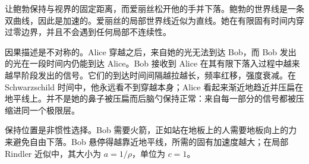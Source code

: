 让鲍勃保持与视界的固定距离，而爱丽丝松开他的手并下落。鲍勃的世界线是一条双曲线，因此是加速的。爱丽丝的局部世界线近似为直线。她在有限固有时间内穿过零边界，并且不会遇到任何局部不连续性。

因果描述是不对称的。Alice 穿越之后，来自她的光无法到达 Bob，而 Bob 发出的光在一段时间内仍能到达 Alice。Bob 接收到 Alice 在其有限下落入过程中越来越早阶段发出的信号。它们的到达时间间隔越拉越长，频率红移，强度衰减。在 Schwarzschild 时间中，他永远看不到穿越本身；Alice 看起来渐近地趋近并压扁在地平线上。并不是她的鼻子被压扁而后脑勺保持正常：来自每一部分的信号都被压缩进同一个极限层。

\begin{classroomqa}
\end{classroomqa}

\begin{classroomqa}
\end{classroomqa}

保持位置是非惯性选择。Bob 需要火箭，正如站在地板上的人需要地板向上的力来避免自由下落。Bob 悬停得越靠近地平线，所需的固有加速度越大；在局部 Rindler 近似中，其大小为 \(a=1/\rho\)，单位为 \(c=1\)。

\begin{classroomqa}
\end{classroomqa}

\begin{classroomqa}
\end{classroomqa}

